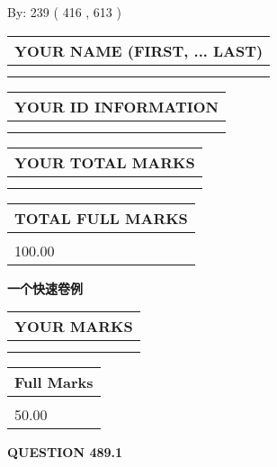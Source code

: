 \documentclass{ctexart}
\begin{document}
   
\hspace{1.0in} By: 
 239 ( 416 ,  613 )
   
   
   
   
\newpage 
\setcounter{page}{ 
   489001 } 
   
   
   
   
\noindent\begin{tabular}{|l|}
\hline
YOUR NAME (FIRST, ... LAST)  \\
\hline
 \\ 
 \\ 
\hline
\end{tabular}
\hspace{0.05in} \begin{tabular}{|l|}
\hline
 YOUR   ID   INFORMATION  \\
\hline
 \\ 
 \\ 
\hline
\end{tabular}
   
   
\vspace{0.2in}\noindent\begin{tabular}{|l|}
\hline
YOUR TOTAL MARKS  \\
\hline
 \\ 
 \\ 
\hline
\end{tabular}
\hspace{0.05in} \begin{tabular}{|l|}
\hline
TOTAL FULL MARKS  \\
\hline
 \\ 
100.00 \\
\hline
\end{tabular}
   
   
 \vspace{0.2in}
{\LARGE {\textbf{ 一个快速卷例}}}
   
   
  
\vspace{0.2in}
  
\noindent\begin{tabular}{|l|}
\hline
 YOUR MARKS  \\
\hline
 \\ 
 \\ 
\hline
\end{tabular}
\hspace{0.05in} \begin{tabular}{|l|}
\hline
 Full Marks  \\
\hline
 \\ 
50.00 \\
\hline
\end{tabular}
{\textbf{\Large{QUESTION
489.1 
}}}
  
\end{document}
